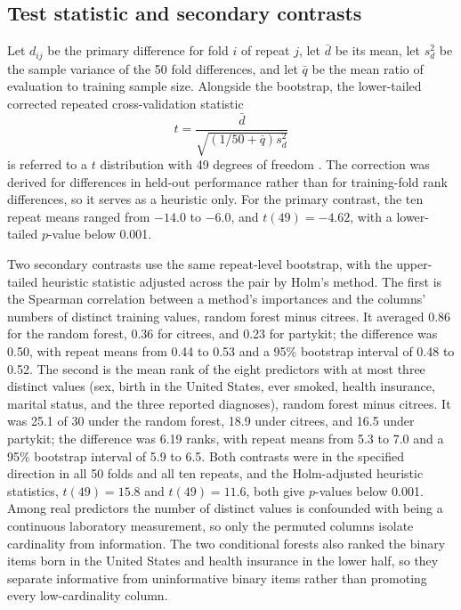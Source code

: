\documentclass[11pt]{article}
\newcommand{\pkg}[1]{{\normalfont\fontseries{b}\selectfont #1}}
\newcommand{\citrees}{\pkg{citrees}\xspace}
\begin{document}
\subsection{Test statistic and secondary contrasts}

Let $d_{ij}$ be the primary difference for fold $i$ of repeat $j$, let
$\bar{d}$ be its mean, let $s_d^2$ be the sample variance of the 50 fold
differences, and let $\bar{q}$ be the mean ratio of evaluation to training
sample size. Alongside the bootstrap, the lower-tailed corrected repeated
cross-validation statistic
%
\begin{equation}
  t =
  \frac{\bar{d}}
       {\sqrt{\left(1/50 + \bar{q}\right)s_d^2}}
  \label{eq:nhanes-corrected-cv}
\end{equation}
%
is referred to a $t$ distribution with 49 degrees of freedom
\citep{Bouckaert+Frank:2004}. The correction was derived for differences in
held-out performance rather than for training-fold rank differences, so it
serves as a heuristic only. For the primary contrast, the ten repeat means ranged from
$-14.0$ to $-6.0$, and $t(49) = -4.62$, with a lower-tailed $p$-value below
0.001.

Two secondary contrasts use the same repeat-level bootstrap, with the
upper-tailed heuristic statistic adjusted across the pair by Holm's method.
The first is the Spearman correlation between a method's importances and the
columns' numbers of distinct training values, random forest minus \citrees.
It averaged 0.86 for the random forest, 0.36 for \citrees, and 0.23 for
\pkg{partykit}; the difference was 0.50, with repeat means from 0.44 to 0.53
and a 95\% bootstrap interval of 0.48 to 0.52. The second is the mean rank of
the eight predictors with at most three distinct values (sex, birth in the
United States, ever smoked, health insurance, marital status, and the three
reported diagnoses), random forest minus \citrees. It was 25.1 of 30 under
the random forest, 18.9 under \citrees, and 16.5 under \pkg{partykit}; the
difference was 6.19 ranks, with repeat means from 5.3 to 7.0 and a 95\%
bootstrap interval of 5.9 to 6.5. Both contrasts were in the specified
direction in all 50 folds and all ten repeats, and the Holm-adjusted
heuristic statistics, $t(49) = 15.8$ and $t(49) = 11.6$, both give $p$-values
below 0.001. Among real predictors the number of distinct values is
confounded with being a continuous laboratory measurement, so only the
permuted columns isolate cardinality from information. The two conditional
forests also ranked the binary items born in the United States and health
insurance in the lower half, so they separate informative from uninformative
binary items rather than promoting every low-cardinality column.
\end{document}
